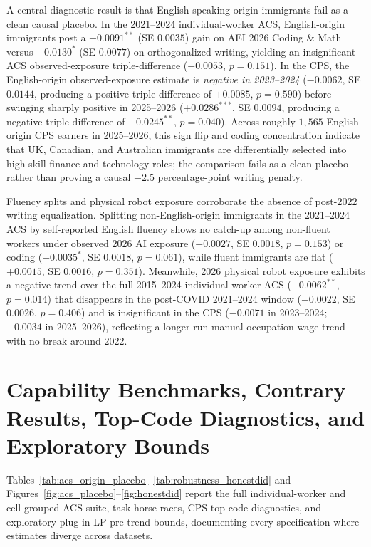 \documentclass[11pt]{amsart}
\begin{document}
A central diagnostic result is that English-speaking-origin immigrants fail as a clean causal placebo. In the 2021--2024 individual-worker ACS, English-origin immigrants post a $+0.0091^{**}$ (SE $0.0035$) gain on AEI 2026 Coding \& Math versus $-0.0130^{*}$ (SE $0.0077$) on orthogonalized writing, yielding an insignificant ACS observed-exposure triple-difference ($-0.0053$, $p = 0.151$). In the CPS, the English-origin observed-exposure estimate is \emph{negative in 2023--2024} ($-0.0062$, SE $0.0144$, producing a positive triple-difference of $+0.0085$, $p = 0.590$) before swinging sharply positive in 2025--2026 ($+0.0286^{***}$, SE $0.0094$, producing a negative triple-difference of $-0.0245^{**}$, $p = 0.040$). Across roughly $1{,}565$ English-origin CPS earners in 2025--2026, this sign flip and coding concentration indicate that UK, Canadian, and Australian immigrants are differentially selected into high-skill finance and technology roles; the comparison fails as a clean placebo rather than proving a causal $-2.5$ percentage-point writing penalty.

Fluency splits and physical robot exposure corroborate the absence of post-2022 writing equalization. Splitting non-English-origin immigrants in the 2021--2024 ACS by self-reported English fluency shows no catch-up among non-fluent workers under observed 2026 AI exposure ($-0.0027$, SE $0.0018$, $p = 0.153$) or coding ($-0.0035^{*}$, SE $0.0018$, $p = 0.061$), while fluent immigrants are flat ($+0.0015$, SE $0.0016$, $p = 0.351$). Meanwhile, 2026 physical robot exposure exhibits a negative trend over the full 2015--2024 individual-worker ACS ($-0.0062^{**}$, $p = 0.014$) that disappears in the post-COVID 2021--2024 window ($-0.0022$, SE $0.0026$, $p = 0.406$) and is insignificant in the CPS ($-0.0071$ in 2023--2024; $-0.0034$ in 2025--2026), reflecting a longer-run manual-occupation wage trend with no break around 2022.

\section{Capability Benchmarks, Contrary Results, Top-Code Diagnostics, and Exploratory Bounds}

Tables~\ref{tab:acs_origin_placebo}--\ref{tab:robustness_honestdid} and Figures~\ref{fig:acs_placebo}--\ref{fig:honestdid} report the full individual-worker and cell-grouped ACS suite, task horse races, CPS top-code diagnostics, and exploratory plug-in LP pre-trend bounds, documenting every specification where estimates diverge across datasets.
\end{document}
